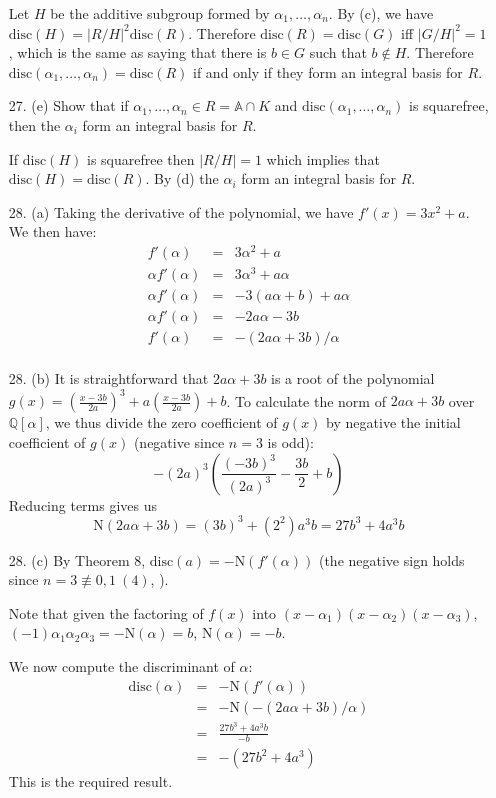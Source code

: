 \documentclass{article}
\newcommand{\Q}[0]{\mathbb{Q}}
\newcommand{\norm}[0]{\text{N}}
\newcommand{\disc}[1]{\text{disc}(#1)}
\newcommand{\ringofintegers}[1]{\mathbb{A} \cap #1}
\begin{document}
\begin{enumerate}
Let $H$ be the additive subgroup formed by $\alpha_1, \ldots, \alpha_n$.  By (c), we have $\disc{H} = |R/H|^2 \disc{R}$.  Therefore $\disc{R} = \disc{G}$ iff $|G/H|^2 = 1$, which is the same as saying that there is $b \in G$ such that $b \not\in H$.  Therefore $\disc{\alpha_1, \ldots, \alpha_n} = \disc{R}$ if and only if they form an integral basis for $R$.

\item[27. (e)] Show that if $\alpha_1, \ldots, \alpha_n \in R = \ringofintegers{K}$ and $\disc{\alpha_1, \ldots, \alpha_n}$ is squarefree, then the $\alpha_i$ form an integral basis for $R$.

If $\disc{H}$ is squarefree then $|R / H| = 1$ which implies that $\disc{H} = \disc{R}$.  By (d) the $\alpha_i$ form an integral basis for $R$.

\item [28. (a)] Taking the derivative of the polynomial, we have $f'(x) = 3x^2 + a$.  We then have:
\begin{eqnarray*}
    f'(\alpha) &=& 3\alpha^2 + a \\
    \alpha f'(\alpha) &=& 3\alpha^3 + a\alpha \\
    \alpha f'(\alpha) &=& -3(a\alpha + b) + a\alpha \\
    \alpha f'(\alpha) &=& -2a\alpha - 3b \\
    f'(\alpha) &=& -(2a\alpha + 3b) / \alpha \\
\end{eqnarray*}

\item [28. (b)] It is straightforward that $2a\alpha + 3b$ is a root of the polynomial $g(x) = (\frac{x - 3b}{2a})^3 + a(\frac{x - 3b}{2a}) + b$.  To calculate the norm of $2a\alpha + 3b$ over $\Q[\alpha]$, we thus divide the zero coefficient of $g(x)$ by negative the initial coefficient of $g(x)$ (negative since $n = 3$ is odd):
\[ -(2a)^3\left(\frac{(-3b)^3}{(2a)^3} - \frac{3b}{2} + b\right) \]
Reducing terms gives us
\[ \norm(2a\alpha + 3b) = (3b)^3 + (2^2)a^3b = 27b^3 + 4a^3b \]

\item[28. (c)] By Theorem 8, $\disc{a} = -\norm(f'(\alpha))$ (the negative sign holds since $n = 3 \not\equiv 0,1 \ (4)$, ).

Note that given the factoring of $f(x)$ into $(x - \alpha_1)(x - \alpha_2)(x - \alpha_3)$, $(-1)\alpha_1\alpha_2\alpha_3 = -\norm(\alpha) = b$, $\norm(\alpha) = -b$.

We now compute the discriminant of $\alpha$:
\begin{eqnarray*}
    \disc{\alpha} &=& -\norm(f'(\alpha)) \\
                    &=& -\norm(-(2a\alpha + 3b)/\alpha) \\
                    &=& \frac{27b^3 + 4a^3b}{-b} \\
                    &=& -(27b^2 + 4a^3)
\end{eqnarray*}
This is the required result.


\end{enumerate}
\end{document}
